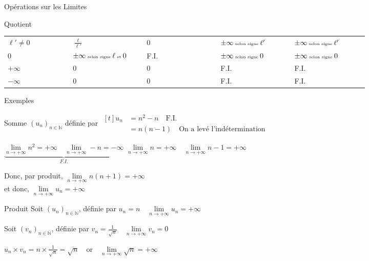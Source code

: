 \documentclass{cours}
\begin{document}
\begin{Gpartie}{Opérations sur les Limites}
\begin{Spartie}{Quotient}
\begin{table}[H]
{\begin{tabular}{ p{0.15\linewidth} *{4}{M{0.17\linewidth} }}
                        $\ell'\neq 0$   & $\frac{\ell}{\ell'}$                                          & $0$ & $\pm\infty\text{\tiny{ selon signe }}\ell'$ & $\pm\infty\text{\tiny{ selon signe }}\ell'$   \\ 
                        $0$             & $\pm\infty\text{\tiny{ selon signe }}\ell\text{\tiny{ et }}0$ & F.I.& $\pm\infty\text{\tiny{ selon signe }}0$     & $\pm\infty\text{\tiny{ selon signe }}0$       \\
                        $+\infty$       & $0$                                                           & $0$ & F.I.                                        & F.I.                                          \\ 
                        $-\infty$       & $0$                                                           & $0$ & F.I.                                        & F.I.                                          \\ \bottomrule
                    \end{tabular}
                }
            \end{table}
        \end{Spartie}
        \begin{Spartie}{Exemples} 
            \begin{SSpartie}{Somme} 
                $(u_n)_{n\in\mathbb{N}}$ définie par $\begin{aligned}[t]u_n&=n^2-n\quad\text{F.I.} \\ &=n(n-1)\quad\text{On a levé l'indétermination}\end{aligned}$

                $\underbrace{\lim\limits_{n\to +\infty}n^2=+\infty\quad\lim\limits_{n\to +\infty}-n=-\infty}_{F.I.}$
                \qquad$\lim\limits_{n\to +\infty}n=+\infty\quad\lim\limits_{n\to +\infty}n-1=+\infty$

                Donc, par produit, $\lim\limits_{n\to +\infty}n(n+1)=+\infty$ \\ et donc, $\lim\limits_{n\to +\infty}u_n=+\infty$
            \end{SSpartie}
            \begin{SSpartie}{Produit} 
                Soit $(u_n)_{n\in\mathbb{N}}$, définie par $u_n=n\quad\lim\limits_{n\to +\infty}u_n=+\infty$

                Soit $(v_n)_{n\in\mathbb{N}}$, définie par $v_n=\frac{1}{\sqrt{n}}\quad\lim\limits_{n\to +\infty}v_n=0$

                $u_n\times v_n=n\times\frac{1}{\sqrt{n}}=\sqrt{n}\quad\text{or}\quad\lim\limits_{n\to +\infty}\sqrt{n}=+\infty$


\end{SSpartie}
\end{Spartie}
\end{Gpartie}
\end{document}
